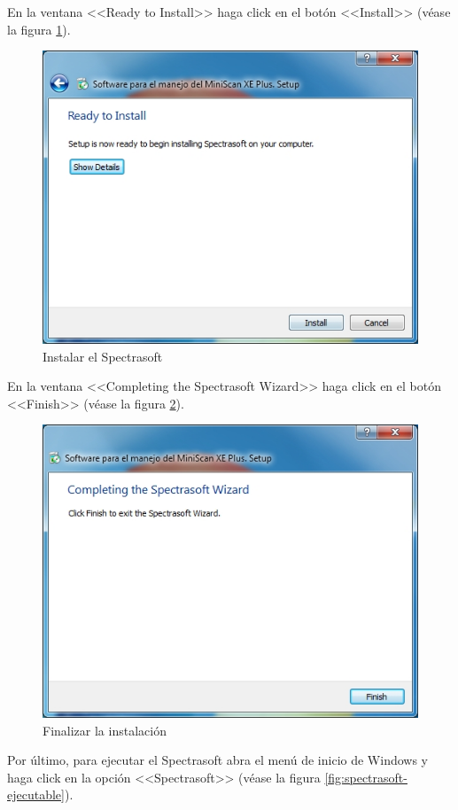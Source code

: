 \newpage

En la ventana <<Ready to Install>> haga click en el bot\'{o}n <<Install>> (v\'{e}ase la figura \ref{fig:spectrasoft-instalar}).

\begin{figure}[H]
  \centering
  \includegraphics[width=.6\linewidth]{./img/spectrasoft-instalar.jpg}
\caption[Instalar el Spectrasoft]{Instalar el Spectrasoft\label{fig:spectrasoft-instalar}}
\end{figure}

En la ventana <<Completing the Spectrasoft Wizard>> haga click en el bot\'{o}n <<Finish>> (v\'{e}ase la figura \ref{fig:spectrasoft-finalizar}).

\begin{figure}[H]
  \centering
  \includegraphics[width=.6\linewidth]{./img/spectrasoft-finalizar.jpg}
\caption[Finalizar la instalaci\'{o}n]{Finalizar la instalaci\'{o}n\label{fig:spectrasoft-finalizar}}
\end{figure}

\newpage

Por \'{u}ltimo, para ejecutar el Spectrasoft abra el men\'{u} de inicio de Windows y haga click en la opci\'{o}n <<Spectrasoft>> (v\'{e}ase la figura \ref{fig:spectrasoft-ejecutable}).

